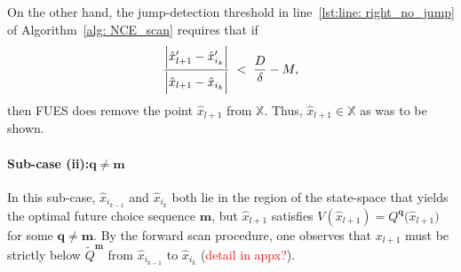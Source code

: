 \documentclass[12pt]{article}
\newcommand{\mVecVar}{\mathbf{m}}
\newcommand{\qVecVar}{\mathbf{q}}
\begin{document}
On the other hand, the jump-detection threshold in line~\ref{lst:line: right_no_jump} of Algorithm~\ref{alg: NCE_scan} requires that if 
\begin{equation}
   \frac{\Bigl|\hat{x}_{l+1}' - \hat{x}_{i_{k}}'\Bigr|}
        {\Bigl|\hat{x}_{l+1} - \hat{x}_{i_{k}}\Bigr|}
   \;<\;
   \frac{D}{\delta} - M,
\end{equation}
then FUES does remove the point $\hat{x}_{l+1}$ from $\mathbb{X}$. Thus, $\hat{x}_{l+1}\in \mathbb{X}$ as was to be shown. 

\paragraph{Sub-case (ii):$\qVecVar \neq \mVecVar$}

In this sub-case, $\hat{x}_{i_{k-1}}$ and $\hat{x}_{i_{k}}$ both lie in the region of the state-space that yields the optimal future choice sequence $\mVecVar$, but $\hat{x}_{l+1}$ satisfies $V(\hat{x}_{l+1}) = Q^{\qVecVar}\bigl(\hat{x}_{l+1}\bigr)$ for some $\qVecVar\neq \mVecVar$.  
By the forward scan procedure, one observes that $x_{l+1}$ must be strictly below $\widetilde{Q}^{\mVecVar}$ from $\hat{x}_{i_{k-1}}$ to $\hat{x}_{i_{k}}$ (\textcolor{red}{detail in appx?}). 


\end{document}

